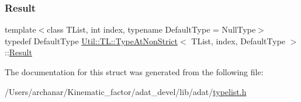 \mbox{\label{structUtil_1_1TL_1_1TypeAtNonStrict_a39b06fe5e93590ee7a8870acb2017521}} 
\subsubsection{\texorpdfstring{Result}{Result}\hspace{0.1cm}{\footnotesize\ttfamily [2/2]}}
{\footnotesize\ttfamily template$<$class T\+List, int index, typename Default\+Type = Null\+Type$>$ \\
typedef Default\+Type \mbox{\hyperlink{structUtil_1_1TL_1_1TypeAtNonStrict}{Util\+::\+T\+L\+::\+Type\+At\+Non\+Strict}}$<$ T\+List, index, Default\+Type $>$\+::\mbox{\hyperlink{structUtil_1_1TL_1_1TypeAtNonStrict_a39b06fe5e93590ee7a8870acb2017521}{Result}}}



The documentation for this struct was generated from the following file\+:\begin{DoxyCompactItemize}
\item 
/\+Users/archanar/\+Kinematic\+\_\+factor/adat\+\_\+devel/lib/adat/\mbox{\hyperlink{lib_2adat_2typelist_8h}{typelist.\+h}}\end{DoxyCompactItemize}
